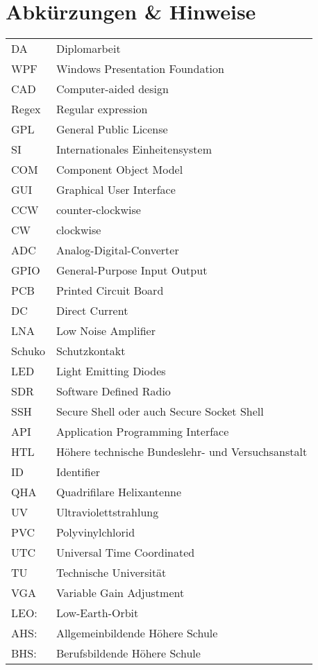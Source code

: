 \section*{Abkürzungen \& Hinweise}
\begin{singlespace}
	\begin{tabular}{ll}
		DA     & Diplomarbeit \\
		WPF    & Windows Presentation Foundation \\
		CAD    & Computer-aided design \\
		Regex  & Regular expression \\
		GPL    & General Public License  \\
		SI     & Internationales Einheitensystem \\
		COM    & Component Object Model \\
		GUI    & Graphical User Interface \\
		CCW	   & counter-clockwise \\
		CW     & clockwise \\
		ADC	   & Analog-Digital-Converter \\
		GPIO   & General-Purpose Input Output \\
		PCB	   & Printed Circuit Board \\
		DC     & Direct Current \\
		LNA    & Low Noise Amplifier \\
		Schuko & Schutzkontakt \\
		LED	   & Light Emitting Diodes \\
		SDR    & Software Defined Radio \\
		SSH    & Secure Shell oder auch Secure Socket Shell \\
		API    & Application Programming Interface \\
		HTL    & Höhere technische Bundeslehr- und Versuchsanstalt \\
		ID     & Identifier \\
		QHA    & Quadrifilare Helixantenne \\
		UV     & Ultraviolettstrahlung \\
		PVC    & Polyvinylchlorid \\
		UTC    & Universal Time Coordinated \\
		TU     & Technische Universität \\
		VGA    & Variable Gain Adjustment \\
		LEO:   & Low-Earth-Orbit \\
		AHS:   & Allgemeinbildende Höhere Schule \\
		BHS:   & Berufsbildende Höhere Schule \\
	\end{tabular}
\end{singlespace}

\pagebreak
